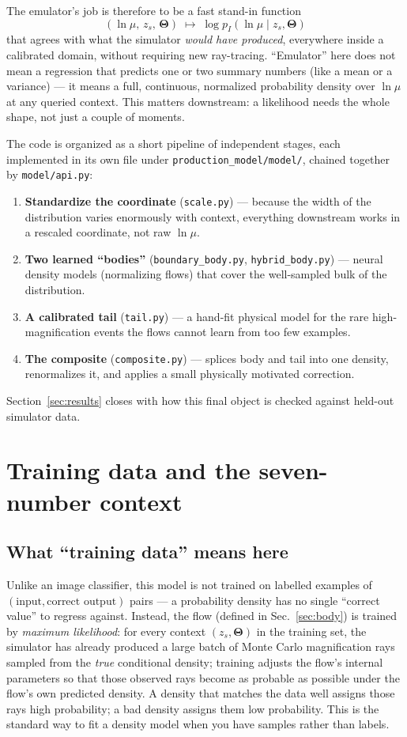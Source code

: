 \documentclass[11pt]{article}
\newcommand{\file}[1]{\texttt{#1}}
\newcommand{\vect}[1]{\boldsymbol{#1}}
\begin{document}
The emulator's job is therefore to be a fast stand-in function
\[
 (\ln\mu,\, z_s,\, \vect\Theta) \;\longmapsto\; \log p_I(\ln\mu \mid z_s,\vect\Theta)
\]
that agrees with what the simulator \emph{would have produced}, everywhere
inside a calibrated domain, without requiring new ray-tracing. ``Emulator''
here does not mean a regression that predicts one or two summary numbers
(like a mean or a variance) — it means a full, continuous, normalized
probability density over $\ln\mu$ at any queried context. This matters
downstream: a likelihood needs the whole shape, not just a couple of
moments.

The code is organized as a short pipeline of independent stages, each
implemented in its own file under \file{production\_model/model/}, chained
together by \file{model/api.py}:
\begin{enumerate}
 \item \textbf{Standardize the coordinate} (\file{scale.py}) — because the
   width of the distribution varies enormously with context, everything
   downstream works in a rescaled coordinate, not raw $\ln\mu$.
 \item \textbf{Two learned ``bodies''} (\file{boundary\_body.py},
   \file{hybrid\_body.py}) — neural density models (normalizing flows) that
   cover the well-sampled bulk of the distribution.
 \item \textbf{A calibrated tail} (\file{tail.py}) — a hand-fit physical
   model for the rare high-magnification events the flows cannot learn from
   too few examples.
 \item \textbf{The composite} (\file{composite.py}) — splices body and tail
   into one density, renormalizes it, and applies a small physically
   motivated correction.
\end{enumerate}
Section~\ref{sec:results} closes with how this final object is checked
against held-out simulator data.

\section{Training data and the seven-number context}
\label{sec:data}

\subsection{What ``training data'' means here}

Unlike an image classifier, this model is not trained on labelled examples
of $(\text{input}, \text{correct output})$ pairs — a probability density has
no single ``correct value'' to regress against. Instead, the flow (defined
in Sec.~\ref{sec:body}) is trained by \emph{maximum likelihood}: for every
context $(z_s,\vect\Theta)$ in the training set, the simulator has already
produced a large batch of Monte Carlo magnification rays sampled from the
\emph{true} conditional density; training adjusts the flow's internal
parameters so that those observed rays become as probable as possible under
the flow's own predicted density. A density that matches the data well
assigns those rays high probability; a bad density assigns them low
probability. This is the standard way to fit a density model when you have
samples rather than labels.
\end{document}
